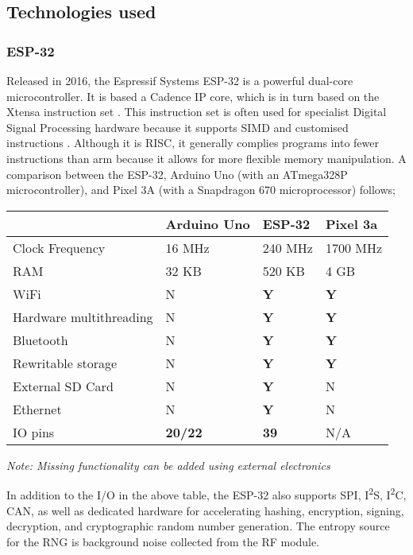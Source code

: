 \documentclass{article}
\begin{document}
\subsection{Technologies used}
\subsubsection{ESP-32}

Released in 2016, the Espressif Systems ESP-32 is a powerful dual-core microcontroller.
It is based a Cadence IP core, which is in turn based on the Xtensa instruction set \cite{32datasheet}.
This instruction set is often used for specialist Digital Signal Processing hardware because it supports SIMD and customised instructions \cite{lx6datasheet}.
Although it is RISC, it generally complies programs into fewer instructions than arm because it allows for more flexible memory manipulation.
A comparison between the ESP-32, Arduino Uno (with an ATmega328P microcontroller), and Pixel 3A (with a Snapdragon 670 microprocessor) follows;

\begin{table}[h]
\begin{tabular}{l|lll}
						& Arduino Uno		& ESP-32		& Pixel 3a		\\ \hline
Clock Frequency			& 16 MHz			& 240 MHz		& 1700 MHz		\\ \hline
RAM						& 32 KB				& 520 KB		& 4 GB			\\ \hline
WiFi 					& N 				& \textbf{Y}	& \textbf{Y}	\\ \hline
Hardware multithreading	& N 				& \textbf{Y}	& \textbf{Y}	\\ \hline
Bluetooth				& N 				& \textbf{Y}	& \textbf{Y}	\\ \hline
Rewritable storage		& N 				& \textbf{Y}	& \textbf{Y}	\\ \hline
External SD Card		& N 				& \textbf{Y}	& N				\\ \hline
Ethernet				& N 				& \textbf{Y}	& N				\\ \hline
IO pins					& \textbf{20/22}	& \textbf{39}	& N/A			\\

\end{tabular}
\end{table}

\emph{Note: Missing functionality can be added using external electronics}

In addition to the I/O in the above table, the ESP-32 also supports SPI, I\textsuperscript{2}S, I\textsuperscript{2}C, CAN, as well as dedicated hardware for accelerating hashing, encryption, signing, decryption, and cryptographic random number generation.
The entropy source for the RNG is background noise collected from the RF module.
\end{document}
